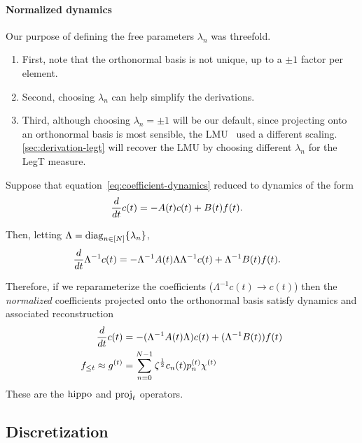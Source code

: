\documentclass[../hippo.tex]{subfiles}
\begin{document}
\paragraph{Normalized dynamics}

Our purpose of defining the free parameters $\lambda_n$ was threefold.
\begin{enumerate}%
  \item First, note that the orthonormal basis is not unique, up to a $\pm 1$ factor per element.
  \item Second, choosing $\lambda_n$ can help simplify the derivations.
  \item Third, although choosing $\lambda_n = \pm 1$ will be our default, since projecting onto an orthonormal basis is most sensible, the LMU~\citep{voelker2019legendre} used a different scaling. \cref{sec:derivation-legt} will recover the LMU by choosing different $\lambda_n$ for the LegT measure.
\end{enumerate}


Suppose that equation~\eqref{eq:coefficient-dynamics} reduced to dynamics of the form
\begin{align*}
  \frac{d}{d t} c(t) &= -A(t) c(t) + B(t) f(t).
\end{align*}

Then, letting $\Lambda = \operatorname*{diag}_{n \in [N]} \{\lambda_n\}$,
\begin{align*}
  \frac{d}{d t} \Lambda^{-1} c(t) &= -\Lambda^{-1} A(t) \Lambda \Lambda^{-1} c(t) + \Lambda^{-1} B(t) f(t).
\end{align*}

Therefore, if we reparameterize the coefficients ($\Lambda^{-1} c(t) \to c(t)$) then the
\emph{normalized} coefficients projected onto the orthonormal basis satisfy dynamics
and associated reconstruction
\begin{align}
  \label{eq:coefficient-dynamics-normalized}
  \frac{d}{d t} c(t) &= -(\Lambda^{-1} A(t) \Lambda) c(t) + (\Lambda^{-1} B(t)) f(t)
  \\
  \label{eq:reconstruction-normalized}
  f_{\leq t} \approx g^{(t)}
  &= \sum_{n=0}^{N-1} \zeta^{\frac{1}{2}} c_n(t) p_n^{(t)} \chi^{(t)}
\end{align}
These are the $\operatorname{hippo}$ and $\operatorname{proj}_t$ operators.








\subsection{Discretization}
\label{sec:framework-discretization}
\end{document}
